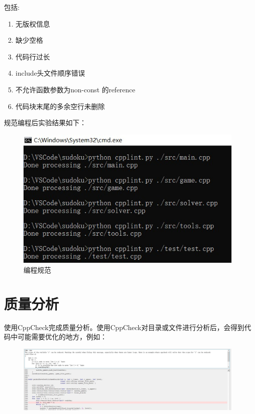 \documentclass[a4paper]{article}
\begin{document}
包括:

\begin{enumerate}
	\item 无版权信息
	\item 缺少空格
	\item 代码行过长
	\item include头文件顺序错误
	\item 不允许函数参数为non-const 的reference
	\item 代码块末尾的多余空行未删除
\end{enumerate}

规范编程后实验结果如下：

\begin{figure}[!ht]
  \centering
  \includegraphics[scale=0.9]{images/cpplint.jpg}
  \caption{编程规范}
  \label{fig:cpplint}
\end{figure}

\section{质量分析}
使用CppCheck完成质量分析。使用CppCheck对目录或文件进行分析后，会得到代码中可能需要优化的地方，例如：

\begin{figure}[H]
  \centering
  \includegraphics[scale=0.4]{images/ncppcheck.jpg}
  \label{fig:ncppcheck}
\end{figure}
\end{document}
